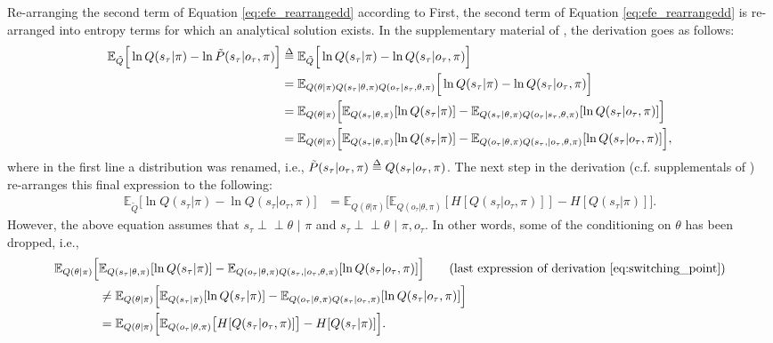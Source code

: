 \documentclass[twoside,11pt]{article}
\makeatletter
\def\delequal{\mathrel{\ensurestackMath{\stackon[1pt]{=}{\scriptstyle\Delta}}}}
\newcommand{\indep}{\perp \! \! \! \perp}
\newcounter{subsubsubsection}[subsubsection]
\def\subsubsubsection{\@startsection
     {subsubsubsection}{4}{\z@} {-3.25ex plus -1
     ex minus -.2ex}{1.5ex plus .2ex}{\normalsize\bf}}
\makeatother
\begin{document}
\subsubsubsection{Re-arranging the second term of Equation \eqref{eq:efe_rearrangedd} according to \citet{DeepAIwithMCMC}}
First, the second term of Equation \eqref{eq:efe_rearrangedd} is re-arranged into entropy terms for which an analytical solution exists. In the supplementary material of \citep{DeepAIwithMCMC}, the derivation goes as follows:
\begin{align}
\mathbb{E}_{\tilde{Q}}\Big[ \ln Q(s_\tau|\pi) - \ln \tilde{P}(s_\tau|o_\tau, \pi) \Big] &\delequal \mathbb{E}_{\tilde{Q}}\Big[ \ln Q(s_\tau|\pi) - \ln Q(s_\tau|o_\tau, \pi) \Big]\label{eq:switching_point}\\
&= \mathbb{E}_{Q(\theta|\pi)Q(s_\tau|\theta,\pi)Q(o_\tau|s_\tau,\theta,\pi)}\Big[ \ln Q(s_\tau|\pi) - \ln Q(s_\tau|o_\tau, \pi) \Big]\nonumber\\
&= \mathbb{E}_{Q(\theta|\pi)}\Big[ \mathbb{E}_{Q(s_\tau|\theta,\pi)}[\ln Q(s_\tau|\pi)] - \mathbb{E}_{Q(s_\tau|\theta,\pi)Q(o_\tau|s_\tau,\theta,\pi)}[\ln Q(s_\tau|o_\tau, \pi)] \Big]\nonumber\\
&= \mathbb{E}_{Q(\theta|\pi)}\Big[ \mathbb{E}_{Q(s_\tau|\theta,\pi)}[\ln Q(s_\tau|\pi)] - \mathbb{E}_{Q(o_\tau|\theta,\pi)Q(s_\tau,|o_\tau,\theta,\pi)}[\ln Q(s_\tau|o_\tau, \pi)] \Big],\nonumber
\end{align}
where in the first line a distribution was renamed, i.e., $\tilde{P}(s_\tau|o_\tau, \pi) \delequal Q(s_\tau|o_\tau, \pi)$. The next step in the derivation (c.f. supplementals of \citet{DeepAIwithMCMC}) re-arranges this final expression to the following:
\begin{align*}
\mathbb{E}_{\tilde{Q}}\Big[ \ln Q(s_\tau|\pi) - \ln Q(s_\tau|o_\tau, \pi) \Big] &= \mathbb{E}_{Q(\theta|\pi)}\Big[ \mathbb{E}_{Q(o_\tau|\theta,\pi)}[H[Q(s_\tau|o_\tau, \pi)]] - H[Q(s_\tau|\pi)] \Big].
\end{align*}
However, the above equation assumes that $s_\tau \indep \theta\,\, | \,\,\pi$ and $s_\tau \indep \theta \,\,| \,\,\pi, o_\tau$. In other words, some of the conditioning on $\theta$ has been dropped, i.e.,
\begin{align*}
\mathbb{E}_{Q(\theta|\pi)}\Big[ &\mathbb{E}_{Q(s_\tau|\theta,\pi)}[\ln Q(s_\tau|\pi)] - \mathbb{E}_{Q(o_\tau|\theta,\pi)Q(s_\tau,|o_\tau,\theta,\pi)}[\ln Q(s_\tau|o_\tau, \pi)] \Big] \tag{last expression of derivation \ref{eq:switching_point}}\\
&\neq \mathbb{E}_{Q(\theta|\pi)}\Big[ \mathbb{E}_{Q(s_\tau|\pi)}[\ln Q(s_\tau|\pi)] - \mathbb{E}_{Q(o_\tau|\theta,\pi)Q(s_\tau|o_\tau,\pi)}[\ln Q(s_\tau|o_\tau, \pi)] \Big] \\
&= \mathbb{E}_{Q(\theta|\pi)}\Big[ \mathbb{E}_{Q(o_\tau|\theta,\pi)}\big[H[Q(s_\tau|o_\tau, \pi)]\big] - H[Q(s_\tau|\pi)] \Big].
\end{align*}
\end{document}
